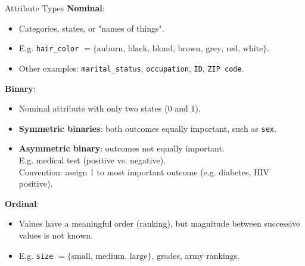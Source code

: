 \begin{frame}{Attribute Types}
  \textbf{Nominal}:
  \begin{itemize}
  \item Categories, states, or "names of things".
  \item E.g. \texttt{hair\_color} $= \{\text{auburn, black, blond, brown, grey, red, white}\}$.
  \item Other examples: \texttt{marital\_status}, \texttt{occupation}, \texttt{ID}, \texttt{ZIP code}.
  \end{itemize}

  \textbf{Binary}:
  \begin{itemize}
  \item Nominal attribute with only two states ($0$ and $1$).
  \item \textbf{Symmetric binaries}: both outcomes equally important, such as \texttt{sex}.
  \item \textbf{Asymmetric binary}: outcomes not equally important. \\
    E.g. medical test (positive vs. negative).\\
    Convention: assign 1 to most important outcome (e.g. diabetes, HIV positive).
  \end{itemize}

  \textbf{Ordinal}:
  \begin{itemize}
  \item Values have a meaningful order (ranking), but magnitude between
    successive values is not known.
  \item E.g. \texttt{size} $= \{\text{small, medium, large}\}$, grades, army rankings.
  \end{itemize}
\end{frame}

